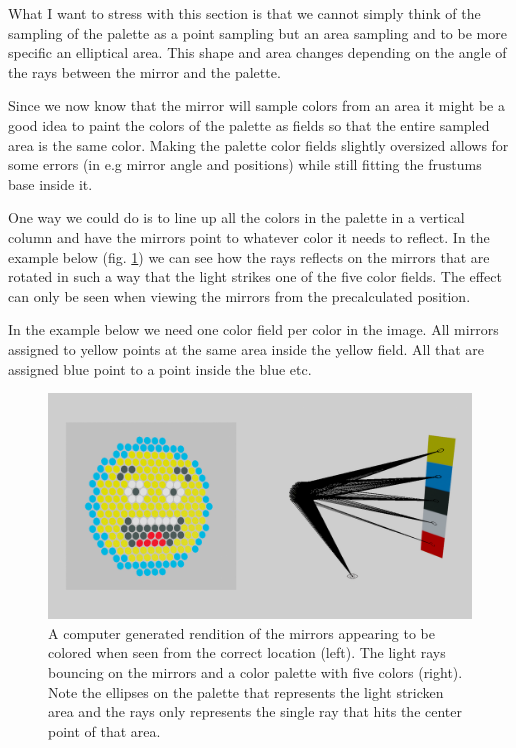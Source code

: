 \documentclass{article}
\begin{document}
What I want to stress with this section is that we cannot simply think
of the sampling of the palette as a point sampling but an area sampling
and to be more specific an elliptical area. This shape and area changes
depending on the angle of the rays between the mirror and the palette.

Since we now know that the mirror will sample colors from an area it
might be a good idea to paint the colors of the palette as fields so
that the entire sampled area is the same color. Making the palette
color fields slightly oversized allows for some errors (in e.g mirror
angle and positions) while still fitting the frustums base inside it.

One way we could do is to line up all the colors in the palette in a
vertical column and have the mirrors point to whatever color it needs to
reflect. In the example below (fig. \ref{fig:one_image_3d}) we can see how the rays reflects on the
mirrors that are rotated in such a way that the light strikes one of the
five color fields. The effect can only be seen when viewing the mirrors
from the precalculated position.

In the example below we need one color field per color in the image.
All mirrors assigned to yellow points at the same area inside the yellow
field. All that are assigned blue point to a point inside the blue etc.

\begin{figure}[ht!]
\centering
\includegraphics[width=\textwidth]{images/one-image-3d.png}
\caption{A computer generated rendition of the mirrors appearing to be colored when seen from the correct location (left). The light rays bouncing on the mirrors and a color palette with five colors (right). Note the ellipses on the palette that represents the light stricken area and the rays only represents the single ray that hits the center point of that area.}
\label{fig:one_image_3d}
\end{figure}
\end{document}
